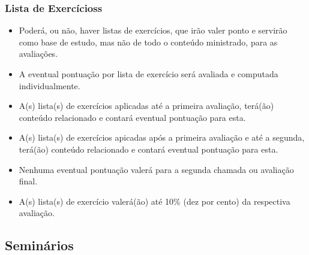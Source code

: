 \begin{frame}[t]\frametitle{Lista de Exercícioss}

  \begin{itemize}
    \justifying{}
    \setlength\itemsep{1em}
    \item Poderá, ou não, haver listas de exercícios, que irão valer ponto e servirão como base de estudo, mas não de todo o conteúdo ministrado, para as avaliações.
    \item A eventual pontuação por lista de exercício será avaliada e computada individualmente.
    \item A(s) lista(s) de exercícios aplicadas até a primeira avaliação, terá(ão) conteúdo relacionado e contará eventual pontuação para esta.
    \item A(s) lista(s) de exercícios apicadas após a primeira avaliação e até a segunda, terá(ão) conteúdo relacionado e contará eventual pontuação para esta.
    \item Nenhuma eventual pontuação valerá para a segunda chamada ou avaliação final.
    \item A(s) lista(s) de exercício valerá(ão) até 10\% (dez por cento) da respectiva avaliação.
  \end{itemize}

\end{frame}



\subsection[Seminários]{Seminários}\label{subsec:planejamento-seminarios}



